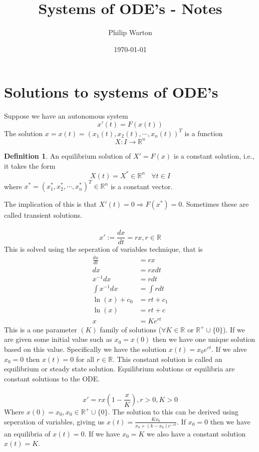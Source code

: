 \documentclass{article}
\theoremstyle{definition}
\newtheorem{definition}{Definition}[section]
\begin{document}
\title{Systems of ODE's - Notes}
\author{Philip Warton}
\date{\today}
\maketitle
\section{Solutions to systems of ODE's}
Suppose we have an autonomous system 
\[x'(t) = F(x(t))\]
The solution $x = x(t) = (x_1(t), x_2(t), \cdots , x_n(t))^T$ is a function
\[X: I \rightarrow \mathbb{R}^n \]
\begin{mdframed}[]
    \begin{definition}
        An equilibrium solution of $X' = F(x)$ is a constant solution, i.e., it takes the form
        \[X(t) = X^* \in \mathbb{R}^n \ \ \ \ \forall t \in I \]
        where $x^* = (x_1^*, x_2^*, \cdots ,x_n^*)^T \in \mathbb{R}^n$ is a constant vector.
    \end{definition}
\end{mdframed}
The implication of this is that $X'(t) = 0 \Rightarrow F(x^*) = 0$. Sometimes these are called transient solutions.
\\\\
\[ x' := \frac{dx}{dt} = rx, r \in \mathbb{R} \]
This is solved using the seperation of variables technique, that is
\begin{align}
    \frac{dx}{dt} &= rx \\
    dx &= rx dt \\
    x^{-1} dx &= r dt \\
    \int x^{-1} dx &= \int r dt \\
    \ln(x) + c_0 &= rt + c_1 \\
    \ln(x) &= rt + c \\
    x &= Ke^{rt}
\end{align}
This is a one parameter $(K)$ family of solutions ($\forall K \in \mathbb{R}$ or $\mathbb{R}^+ \cup \{0\}$).
If we are given some initial value such as $x_0 = x(0)$ then we have one unique solution based on this value.
Specifically we have the solution $x(t) = x_0 e^{rt}$. If we ahve $x_0 = 0$ then $x(t) = 0$ for all $r \in \mathbb{R}$.
This constant solution is called an equilibrium or steady state solution. Equilibrium solutions or equilibria are constant solutions to the ODE.
\\\\
\[x' = rx(1 - \frac{x}{K}), r > 0, K > 0\]
Where $x(0) = x_0, x_0 \in \mathbb{R}^+ \cup \{0\}$.
The solution to this can be derived using seperation of variables, giving us $x(t) = \frac{Kx_0}{x_0 + (k - x_0)e^{-rt}}$.
If $x_0 = 0$ then we have an equilibria of $x(t) = 0$. If we have $x_0 = K$ we also have a constant solution $x(t) = K$.
\end{document}
